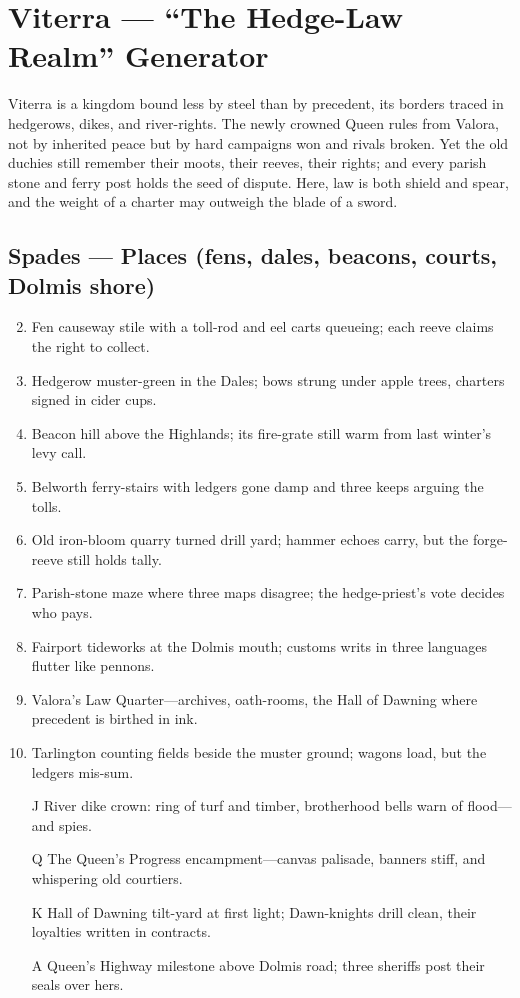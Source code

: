 \section{Viterra --- ``The Hedge-Law Realm'' Generator}
\label{chap:viterra}

Viterra is a kingdom bound less by steel than by precedent, its borders traced in hedgerows, dikes, and river-rights. The newly crowned  Queen rules from Valora, not by inherited peace but by hard campaigns won and rivals broken. Yet the old duchies still remember their moots, their reeves, their rights; and every parish stone and ferry post holds the seed of dispute. Here,  law is both shield and spear, and the weight of a charter may outweigh the blade of a sword.  

\subsection*{Spades --- Places (fens, dales, beacons, courts, Dolmis shore)}
\label{sec:viterra-places}
\begin{enumerate}
\setcounter{enumi}{1}
\item Fen causeway stile with a toll-rod and eel carts queueing; each reeve claims the right to collect.
\item Hedgerow muster-green in the Dales; bows strung under apple trees, charters signed in cider cups.
\item Beacon hill above the Highlands; its fire-grate still warm from last winter’s levy call.
\item Belworth ferry-stairs with ledgers gone damp and three keeps arguing the tolls.
\item Old iron-bloom quarry turned drill yard; hammer echoes carry, but the forge-reeve still holds tally.
\item Parish-stone maze where three maps disagree; the hedge-priest’s vote decides who pays.
\item Fairport tideworks at the Dolmis mouth; customs writs in three languages flutter like pennons.
\item Valora’s Law Quarter—archives, oath-rooms, the Hall of Dawning where precedent is birthed in ink.
\item Tarlington counting fields beside the muster ground; wagons load, but the ledgers mis-sum.
\item[J] River dike crown: ring of turf and timber, brotherhood bells warn of flood—and spies.
\item[Q] The Queen’s Progress encampment—canvas palisade, banners stiff, and whispering old courtiers.
\item[K] Hall of Dawning tilt-yard at first light; Dawn-knights drill clean, their loyalties written in contracts.
\item[A] Queen’s Highway milestone above Dolmis road; three sheriffs post their seals over hers.
\end{enumerate}


